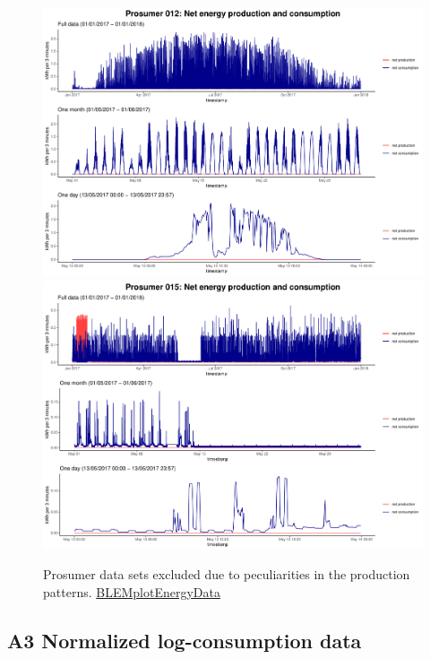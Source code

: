 \begin{centering}
\begin{figure}[H]
        \includegraphics[width=\textwidth-0.85cm]{thesis/graphs/timeseries/p012_prod&cons.pdf}\vspace{0.3cm}
        \includegraphics[width=\textwidth-0.85cm]{thesis/graphs/timeseries/p015_prod&cons.pdf}
        \caption[Prosumer data sets excluded due to peculiarities in the production patterns]{Prosumer data sets excluded due to peculiarities in the production patterns. \quantnet\href{https://github.com/QuantLet/BLEM/tree/master/BLEMplotEnergyData}{BLEMplotEnergyData}}
\end{figure}
\end{centering}


\subsection*{\hypertarget{AppA3:Figures:transform}{A3} Normalized log-consumption data}\label{AppA3:Figures:transform}

